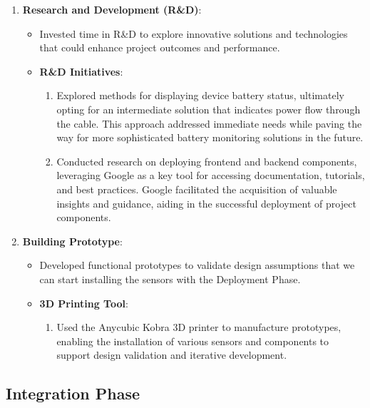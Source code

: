 \begin{enumerate}
 \item \textbf{Research and Development (R\&D)}:
    \begin{itemize}
        \item Invested time in R\&D to explore innovative solutions and technologies that could enhance project outcomes and performance.
        \item \textbf{R\&D Initiatives}:
            \begin{enumerate}
                \item Explored methods for displaying device battery status, ultimately opting for an intermediate solution that indicates power flow through the cable. This approach addressed immediate needs while paving the way for more sophisticated battery monitoring solutions in the future.
                \item Conducted research on deploying frontend and backend components, leveraging Google as a key tool for accessing documentation, tutorials, and best practices. Google facilitated the acquisition of valuable insights and guidance, aiding in the successful deployment of project components.
            \end{enumerate}
    \end{itemize}

    
\item \textbf{Building Prototype}:
    \begin{itemize}
        \item Developed functional prototypes to validate design assumptions that we can start installing the sensors with the Deployment Phase.
    
    \item \textbf{3D Printing Tool}:
    \begin{enumerate}
        \item Used the Anycubic Kobra 3D \citet{anycubic-kobra} printer to manufacture prototypes, enabling the installation of various sensors and components to support design validation and iterative development.
    \end{enumerate}
    \end{itemize}
\end{enumerate}



\subsection{Integration Phase}

